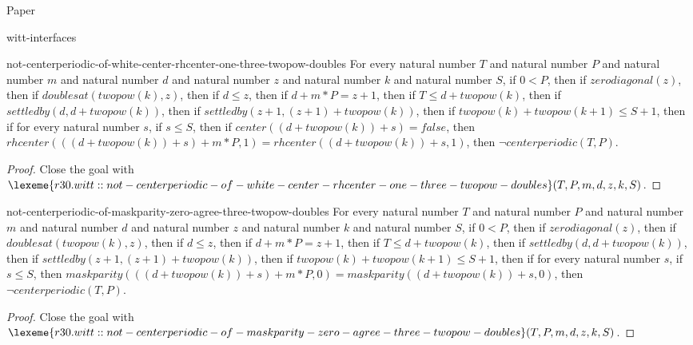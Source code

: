 \begin{lexlean}{Paper}
\begin{section}{witt-interfaces}
  \begin{theorem}{not-centerperiodic-of-white-center-rhcenter-one-three-twopow-doubles}
  For every natural number \(T\) and natural number \(P\) and natural number \(m\) and natural number \(d\) and natural number \(z\) and natural number \(k\) and natural number \(S\), if \(0 < P\), then if \(zerodiagonal(z)\), then if \(doublesat(twopow(k), z)\), then if \(d ≤ z\), then if \(d + m * P = z + 1\), then if \(T ≤ d + twopow(k)\), then if \(settledby(d, d + twopow(k))\), then if \(settledby(z + 1, (z + 1) + twopow(k))\), then if \(twopow(k) + twopow(k + 1) ≤ S + 1\), then if for every natural number \(s\), if \(s ≤ S\), then if \(center((d + twopow(k)) + s) = false\), then \(rhcenter(((d + twopow(k)) + s) + m * P, 1) = rhcenter((d + twopow(k)) + s, 1)\), then \(¬ centerperiodic(T, P)\).
  \begin{proof}
  Close the goal with \(\lexeme{r30.witt::not-centerperiodic-of-white-center-rhcenter-one-three-twopow-doubles}(T, P, m, d, z, k, S)\).
  \end{proof}
  \end{theorem}

  \begin{theorem}{not-centerperiodic-of-maskparity-zero-agree-three-twopow-doubles}
  For every natural number \(T\) and natural number \(P\) and natural number \(m\) and natural number \(d\) and natural number \(z\) and natural number \(k\) and natural number \(S\), if \(0 < P\), then if \(zerodiagonal(z)\), then if \(doublesat(twopow(k), z)\), then if \(d ≤ z\), then if \(d + m * P = z + 1\), then if \(T ≤ d + twopow(k)\), then if \(settledby(d, d + twopow(k))\), then if \(settledby(z + 1, (z + 1) + twopow(k))\), then if \(twopow(k) + twopow(k + 1) ≤ S + 1\), then if for every natural number \(s\), if \(s ≤ S\), then \(maskparity(((d + twopow(k)) + s) + m * P, 0) = maskparity((d + twopow(k)) + s, 0)\), then \(¬ centerperiodic(T, P)\).
  \begin{proof}
  Close the goal with \(\lexeme{r30.witt::not-centerperiodic-of-maskparity-zero-agree-three-twopow-doubles}(T, P, m, d, z, k, S)\).
  \end{proof}
  \end{theorem}


\end{section}
\end{lexlean}
